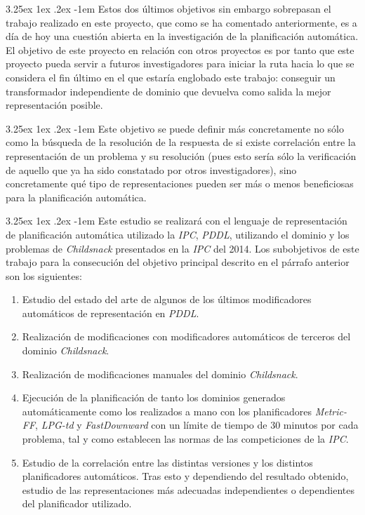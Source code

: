 \documentclass{article}
\makeatletter
\renewcommand\paragraph{\@startsection{paragraph}{5}{\z@}%
      {3.25ex \@plus1ex \@minus.2ex}%
      {-1em}%
      {\normalfont\normalsize\bfseries}}
\makeatother
\begin{document}
    \paragraph{}
    Estos dos últimos objetivos sin embargo sobrepasan el trabajo realizado en este proyecto, que como se ha comentado anteriormente, es a día de hoy una cuestión abierta en la investigación de la planificación automática. El objetivo de este proyecto en relación con otros proyectos es por tanto que este proyecto pueda servir a futuros investigadores para iniciar la ruta hacia lo que se considera el fin último en el que estaría englobado este trabajo: conseguir un transformador independiente de dominio que devuelva como salida la mejor representación posible. 
    
    \paragraph{}
    Este objetivo se puede definir más concretamente no sólo como la búsqueda de la resolución de la respuesta de si existe correlación entre la representación de un problema y su resolución (pues esto sería sólo la verificación de aquello que ya ha sido constatado por otros investigadores), sino concretamente qué tipo de representaciones pueden ser más o menos beneficiosas para la planificación automática.
    
    \paragraph{}
    Este estudio se realizará con el lenguaje de representación de planificación automática utilizado la \textit{IPC}, \textit{PDDL}, utilizando el dominio y los problemas de \textit{Childsnack} presentados en la \textit{IPC} del 2014. Los subobjetivos de este trabajo para la consecución del objetivo principal descrito en el párrafo anterior son los siguientes:
    \begin{enumerate}
        \item Estudio del estado del arte de algunos de los últimos modificadores automáticos de representación en \textit{PDDL}.
        \item Realización de modificaciones con modificadores automáticos de terceros del dominio \textit{Childsnack}.
        \item Realización de modificaciones manuales del dominio \textit{Childsnack}.
        \item Ejecución de la planificación de tanto los dominios generados automáticamente como los realizados a mano con los planificadores \textit{Metric-FF}, \textit{LPG-td} y \textit{FastDownward} con un límite de tiempo de 30 minutos por cada problema, tal y como establecen las normas de las competiciones de la \textit{IPC}.
        \item Estudio de la correlación entre las distintas versiones y los distintos planificadores automáticos. Tras esto y dependiendo del resultado obtenido, estudio de las representaciones más adecuadas independientes o dependientes del planificador utilizado.
    \end{enumerate}
    
\end{document}
